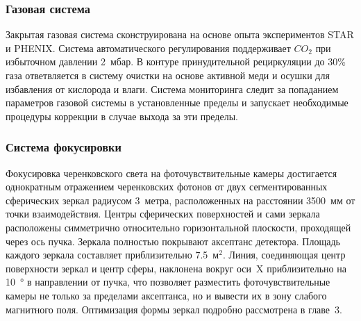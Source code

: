 \subsubsection{Газовая система}\label{sec:CbmRichGasSystem}


Закрытая газовая система сконструирована на основе опыта экспериментов STAR и PHENIX. Система автоматического регулирования поддерживает $CO_{2}$ при избыточном давлении 2~мбар. В контуре принудительной рециркуляции до 30\% газа ответвляется в систему очистки на основе активной меди и осушки для избавления от кислорода и влаги. Система мониторинга следит за попаданием параметров газовой системы в установленные пределы и запускает необходимые процедуры коррекции в случае выхода за эти пределы.

%                                   

\subsubsection{Система фокусировки}\label{sec:CbmRichMirrors}

Фокусировка черенковского света на фоточувствительные камеры достигается однократным отражением черенковских фотонов от двух сегментированных сферических зеркал радиусом 3~метра, расположенных на расстоянии 3500~мм от точки взаимодействия.
Центры сферических поверхностей и сами зеркала расположены симметрично относительно горизонтальной плоскости, проходящей через ось пучка.
Зеркала полностью покрывают аксептанс детектора. Площадь каждого зеркала составляет приблизительно 7.5~м$^2$.
Линия, соединяющая центр поверхности зеркал и центр сферы, наклонена вокруг оси~X приблизительно на \SI{10}{\degree} в направлении от пучка,
что позволяет разместить фоточувствительные камеры не только за пределами аксептанса, но и вывести их в зону слабого магнитного поля.
Оптимизация формы зеркал подробно рассмотрена в главе~3. %

